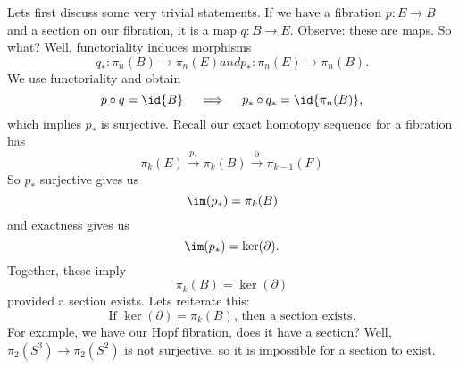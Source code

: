 Lets first discuss some very trivial statements. If we have a
fibration $p\colon E\to B$ and a section on our fibration, it is
a map $q\colon B\to E$. Observe: these are maps. So what? Well,
functoriality induces morphisms
\begin{subequations}
\begin{equation}
q_{*}\colon\pi_{n}(B)\to\pi_{n}(E)
\end{equation}
and
\begin{equation}
p_{*}\colon\pi_{n}(E)\to\pi_{n}(B).
\end{equation}
\end{subequations}
We use functoriality and obtain
\begin{equation}
p\circ q=\id{B}\quad\implies\quad p_{*}\circ q_{*}=\id{\pi_{n}(B)},
\end{equation}
which implies $p_{*}$ is surjective. Recall our exact homotopy
sequence for a fibration has
\begin{equation}
\pi_{k}(E)\xrightarrow{p_{*}}\pi_{k}(B)\xrightarrow{\partial}\pi_{k-1}(F)
\end{equation}
So $p_{*}$ surjective gives us
\begin{equation}
\im(p_{*})=\pi_{k}(B)
\end{equation}
and exactness gives us
\begin{equation}
\im(p_{*})=\ker(\partial).
\end{equation}
Together, these imply
\begin{equation}
\pi_{k}(B)=\ker(\partial)
\end{equation}
provided a section exists. Lets reiterate this:
\begin{equation}
\boxed{\quad\mbox{If $\ker(\partial)=\pi_{k}(B)$, then a section exists.}\quad}
\end{equation}
For example, we have our Hopf fibration, does it have a section?
Well, $\pi_{2}(S^3)\to\pi_{2}(S^2)$ is not surjective, so it is
impossible for a section to exist.

